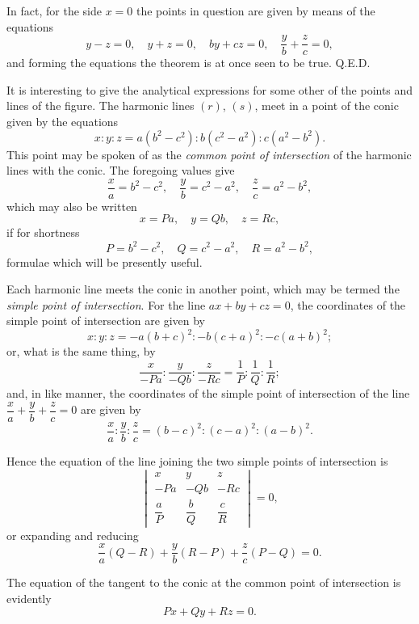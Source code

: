 \documentclass[11pt,a4paper]{article}
\theoremstyle{plain}
\begin{document}
In fact, for the side $x=0$ the points in question are given by means of the equations
\[
y-z=0,\quad y+z=0,\quad by+cz=0,\quad \frac{y}{b}+\frac{z}{c}=0,
\]
and forming the equations the theorem is at once seen to be true. \hfill Q.E.D.

It is interesting to give the analytical expressions for some other of the points and lines of the figure. The harmonic lines $(r)$, $(s)$, meet in a point of the conic given by the equations
\[
x:y:z = a(b^2-c^2) : b(c^2-a^2) : c(a^2-b^2).
\]
This point may be spoken of as the \textit{common point of intersection} of the harmonic lines with the conic. The foregoing values give
\[
\frac{x}{a}=b^2-c^2,\quad \frac{y}{b}=c^2-a^2,\quad \frac{z}{c}=a^2-b^2,
\]
which may also be written
\[
x=Pa,\quad y=Qb,\quad z=Rc,
\]
if for shortness
\[
P=b^2-c^2,\quad Q=c^2-a^2,\quad R=a^2-b^2,
\]
formulae which will be presently useful.

Each harmonic line meets the conic in another point, which may be termed the \textit{simple point of intersection}. For the line $ax+by+cz=0$, the coordinates of the simple point of intersection are given by
\[
x:y:z = -a(b+c)^2 : -b(c+a)^2 : -c(a+b)^2;
\]
or, what is the same thing, by
\[
\frac{x}{-Pa} : \frac{y}{-Qb} : \frac{z}{-Rc}
= \frac{1}{P} : \frac{1}{Q} : \frac{1}{R};
\]
and, in like manner, the coordinates of the simple point of intersection of the line $\dfrac{x}{a}+\dfrac{y}{b}+\dfrac{z}{c}=0$ are given by
\[
\frac{x}{a} : \frac{y}{b} : \frac{z}{c}
= (b-c)^2 : (c-a)^2 : (a-b)^2.
\]

Hence the equation of the line joining the two simple points of intersection is
\[
\begin{vmatrix}
x & y & z \\
-Pa & -Qb & -Rc \\
\dfrac{a}{P} & \dfrac{b}{Q} & \dfrac{c}{R}
\end{vmatrix} = 0,
\]
or expanding and reducing
\[
\frac{x}{a}(Q-R) + \frac{y}{b}(R-P) + \frac{z}{c}(P-Q) = 0.
\]

The equation of the tangent to the conic at the common point of intersection is evidently
\[
Px + Qy + Rz = 0.
\]
\end{document}

